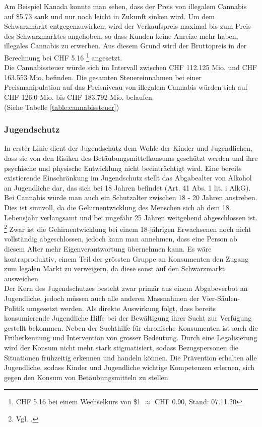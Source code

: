 \documentclass[../main.tex]{subfiles}
\begin{document}
     \noindent	 
	 Am Beispiel Kanada konnte man sehen, dass der Preis von illegalem Cannabis auf \$5.73 sank und nur noch leicht in Zukunft sinken wird.
	 Um dem Schwarzmarkt entgegenzuwirken, wird der Verkaufspreis maximal bis zum Preis des Schwarzmarktes angehoben, so dass Kunden keine Anreize mehr haben, illegales Cannabis zu erwerben.
	 Aus diesem Grund wird der Bruttopreis in der Berechnung bei CHF 5.16%
	 \footnote{CHF 5.16 bei einem Wechselkurs von \$1 $\approx$ CHF 0.90, Stand: 07.11.20}%
	 angesetzt.\\
	 
	 \noindent
	 Die Cannabissteuer würde sich im Intervall zwischen CHF 112.125 Mio. und CHF 163.553 Mio. befinden.	 
	 Die gesamten Steuereinnahmen bei einer Preismanipulation auf das Preisniveau von illegalem Cannabis würden sich auf CHF 126.0 Mio. bis CHF 183.792 Mio. belaufen.\\
	 (Siehe Tabelle \ref{table:cannabissteuer})
	 
	 \subsubsection{Jugendschutz}
	 In erster Linie dient der Jugendschutz dem Wohle der Kinder und Jugendlichen, dass sie von den Risiken des Betäubungsmittelkonsums geschützt werden und ihre psychische und physische Entwicklung nicht beeinträchtigt wird. 
	 Eine bereits existierende Einschränkung im Jugendschutz stellt das Abgabealter von Alkohol an Jugendliche dar, das sich bei 18 Jahren befindet (Art. 41 Abs. 1 lit. i AlkG). 
	 Bei Cannabis würde man auch ein Schutzalter zwischen 18 - 20 Jahren anstreben. 
	 Dies ist sinnvoll, da die Gehirnentwicklung des Menschen sich ab dem 18. Lebensjahr verlangsamt und bei ungefähr 25 Jahren weitgehend abgeschlossen ist.%
	 \footnote{Vgl. \cite{arain-2013}.}
	 Zwar ist die Gehirnentwicklung bei einem 18-jährigen Erwachsenen noch nicht vollständig abgeschlossen, jedoch kann man annehmen, dass eine Person ab diesem Alter mehr Eigenverantwortung übernehmen kann.
	 Es wäre kontraproduktiv, einem Teil der grössten Gruppe an Konsumenten den Zugang zum legalen Markt zu verweigern, da diese sonst auf den Schwarzmarkt ausweichen.\\
	 
	 \noindent
	 Der Kern des Jugendschutzes besteht zwar primär aus einem Abgabeverbot an Jugendliche, jedoch müssen auch alle anderen Massnahmen der Vier-Säulen-Politik umgesetzt werden. 
	 Als direkte Auswirkung folgt, dass bereits konsumierende Jugendliche Hilfe bei der Bewältigung ihrer Sucht zur Verfügung gestellt bekommen. 
	 Neben der Suchthilfe für chronische Konsumenten ist auch die Früherkennung und Intervention von grosser Bedeutung. 
	 Durch eine Legalisierung wird der Konsum nicht mehr stark stigmatisiert, sodass Bezugspersonen die Situationen frühzeitig erkennen und handeln können. 
	 Die Prävention erhalten alle Jugendliche, sodass Kinder und Jugendliche wichtige Kompetenzen erlernen, sich gegen den Konsum von Betäubungsmitteln zu stellen.  
	 
\end{document}
